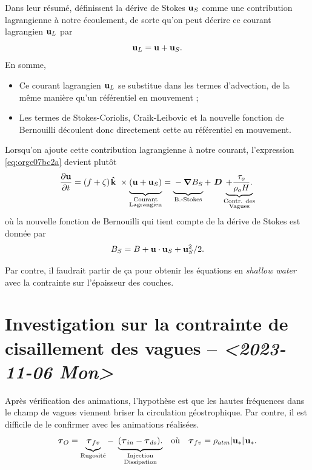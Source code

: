 \documentclass[10pt]{article}
\numberwithin{equation}{section}
\newcommand{\kvf}{\vb{\hat{k}}}
\newcommand{\uu}{\vb{u}}
\newcommand{\tall}{\vphantom{pA^{x^x}_p}}
\newcommand{\grande}{\vphantom{\frac{1}{xx}}}
\newcommand{\pt}{\hspace{1pt}} %
\begin{document}
Dans leur résumé, \Textcite{suzuki2016understanding}  définissent la dérive de Stokes \(\uu_S\) comme une contribution lagrangienne à notre écoulement, de sorte qu'on peut décrire ce courant lagrangien \(\uu_L\) par
\begin{equation}
   \uu_L = \uu + \uu_S.
\end{equation}
En somme, 
\begin{itemize}
\item Ce courant lagrangien \(\uu_L\) se substitue dans les termes d'advection, de la même manière qu'un référentiel en mouvement ;
\item Les termes de Stokes-Coriolis, Craik-Leibovic et la nouvelle fonction de Bernouilli découlent donc directement cette au référentiel en mouvement. \bigskip
\end{itemize}

Lorsqu'on ajoute cette contribution lagrangienne à notre courant, l'expression \ref{eq:orgc07bc2a} devient plutôt
\begin{equation}
   \pdv{\uu}{t} = \qty(f+\zeta)\pt \kvf\ \times\underbrace{\grande\qty(\uu + \uu_S)}_{\substack{\text{Courant} \\ \text{Lagrangien}}} = \underbrace{\grande-\gradient{B_S}}_\text{B.-Stokes} + \ \boldsymbol{D} \underbrace{+ \frac{\tau_o}{\rho_o H}.}_{\substack{\text{Contr. des} \\ \text{Vagues}}}
\end{equation}
où la nouvelle fonction de Bernouilli qui tient compte de la dérive de Stokes est donnée par
\begin{align}
   B_S = B + \uu\cdot\uu_S + \uu_S^2/2.
\end{align}

Par contre, il faudrait partir de ça pour obtenir les équations en \emph{shallow water} avec la contrainte sur l'épaisseur des couches.

\section{Investigation sur la contrainte de cisaillement des vagues -- \textit{<2023-11-06 Mon>}}
\label{sec:org0cc6de6}

Après vérification des animations, l'hypothèse est que les hautes fréquences dans le champ de vagues viennent briser la circulation géostrophique.
Par contre, il est difficile de le confirmer avec les animations réalisées.
\begin{align}
\label{eq:orgd4c02e5}
   && \boldsymbol{\tau}_{O} = \underbrace{\tall\boldsymbol{\tau}_{fv}}_\text{Rugosité}  - \ \underbrace{(\tall\boldsymbol{\tau}_{in} - \boldsymbol{\tau}_{ds}).}_{\substack{\text{Injection} \\ \text{Dissipation}}}
   && \text{où}
   && \boldsymbol{\tau}_{fv} = \rho_{atm} \abs{\uu_*}\pt\uu_*. &&
\end{align}
\end{document}
